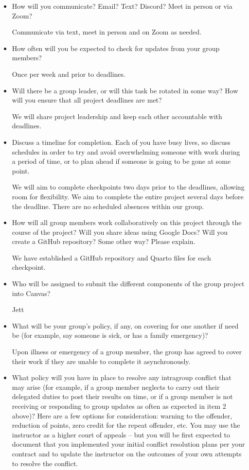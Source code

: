 \documentclass[
  letterpaper,
  DIV=11,
  numbers=noendperiod]{scrartcl}
\begin{document}
\begin{itemize}
\item
  How will you communicate? Email? Text? Discord? Meet in person or via
  Zoom?

  Communicate via text, meet in person and on Zoom as needed.
\item
  How often will you be expected to check for updates from your group
  members?

  Once per week and prior to deadlines.
\item
  Will there be a group leader, or will this task be rotated in some
  way? How will you ensure that all project deadlines are met?

  We will share project leadership and keep each other accountable with
  deadlines.
\item
  Discuss a timeline for completion. Each of you have busy lives, so
  discuss schedules in order to try and avoid overwhelming someone with
  work during a period of time, or to plan ahead if someone is going to
  be gone at some point.

  We will aim to complete checkpoints two days prior to the deadlines,
  allowing room for flexibility. We aim to complete the entire project
  several days before the deadline. There are no scheduled absences
  within our group.
\item
  How will all group members work collaboratively on this project
  through the course of the project? Will you share ideas using Google
  Docs? Will you create a GitHub repository? Some other way? Please
  explain.

  We have established a GitHub repository and Quarto files for each
  checkpoint.
\item
  Who will be assigned to submit the different components of the group
  project into Canvas?

  Jett
\item
  What will be your group's policy, if any, on covering for one another
  if need be (for example, say someone is sick, or has a family
  emergency)?

  Upon illness or emergency of a group member, the group has agreed to
  cover their work if they are unable to complete it asynchronously.
\item
  What policy will you have in place to resolve any intragroup conflict
  that may arise (for example, if a group member neglects to carry out
  their delegated duties to post their results on time, or if a group
  member is not receiving or responding to group updates as often as
  expected in item 2 above)? Here are a few options for consideration:
  warning to the offender, reduction of points, zero credit for the
  repeat offender, etc. You may use the instructor as a higher court of
  appeals -- but you will be first expected to document that you
  implemented your initial conflict resolution plans per your contract
  and to update the instructor on the outcomes of your own attempts to
  resolve the conflict.


\end{itemize}
\end{document}
